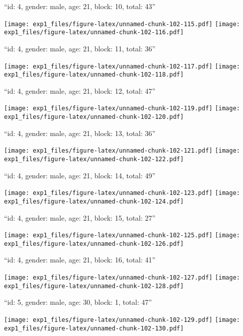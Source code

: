 \documentclass[11pt,,]{article}
\begin{document}
\newpage
[1] 

``id: 4, gender: male, age: 21, block: 10, total: 43''

\texttt{[image: exp1\_files/figure-latex/unnamed-chunk-102-115.pdf]}
\texttt{[image: exp1\_files/figure-latex/unnamed-chunk-102-116.pdf]}

\newpage
[1] 

``id: 4, gender: male, age: 21, block: 11, total: 36''

\texttt{[image: exp1\_files/figure-latex/unnamed-chunk-102-117.pdf]}
\texttt{[image: exp1\_files/figure-latex/unnamed-chunk-102-118.pdf]}

\newpage
[1] 

``id: 4, gender: male, age: 21, block: 12, total: 47''

\texttt{[image: exp1\_files/figure-latex/unnamed-chunk-102-119.pdf]}
\texttt{[image: exp1\_files/figure-latex/unnamed-chunk-102-120.pdf]}

\newpage
[1] 

``id: 4, gender: male, age: 21, block: 13, total: 36''

\texttt{[image: exp1\_files/figure-latex/unnamed-chunk-102-121.pdf]}
\texttt{[image: exp1\_files/figure-latex/unnamed-chunk-102-122.pdf]}

\newpage
[1] 

``id: 4, gender: male, age: 21, block: 14, total: 49''

\texttt{[image: exp1\_files/figure-latex/unnamed-chunk-102-123.pdf]}
\texttt{[image: exp1\_files/figure-latex/unnamed-chunk-102-124.pdf]}

\newpage
[1] 

``id: 4, gender: male, age: 21, block: 15, total: 27''

\texttt{[image: exp1\_files/figure-latex/unnamed-chunk-102-125.pdf]}
\texttt{[image: exp1\_files/figure-latex/unnamed-chunk-102-126.pdf]}

\newpage
[1] 

``id: 4, gender: male, age: 21, block: 16, total: 41''

\texttt{[image: exp1\_files/figure-latex/unnamed-chunk-102-127.pdf]}
\texttt{[image: exp1\_files/figure-latex/unnamed-chunk-102-128.pdf]}

\newpage
[1] 

``id: 5, gender: male, age: 30, block: 1, total: 47''

\texttt{[image: exp1\_files/figure-latex/unnamed-chunk-102-129.pdf]}
\texttt{[image: exp1\_files/figure-latex/unnamed-chunk-102-130.pdf]}
\end{document}
